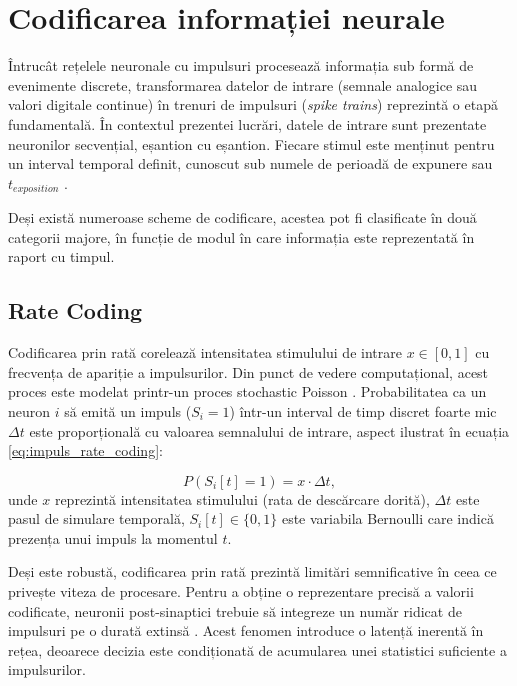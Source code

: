 \section{Codificarea informației neurale}
\label{sc:codificare}

Întrucât rețelele neuronale cu impulsuri procesează informația sub formă de evenimente discrete, transformarea datelor de intrare (semnale analogice sau valori digitale continue) în trenuri de impulsuri (\textit{spike trains}) reprezintă o etapă fundamentală. În contextul prezentei lucrări, datele de intrare sunt prezentate neuronilor secvențial, eșantion cu eșantion. Fiecare stimul este menținut pentru un interval temporal definit, cunoscut sub numele de perioadă de expunere sau $t_{exposition}$ \cite{falez2019}. 

Deși există numeroase scheme de codificare, acestea pot fi clasificate în două categorii majore, în funcție de modul în care informația este reprezentată în raport cu timpul.

\subsection*{Rate Coding}
Codificarea prin rată corelează intensitatea stimulului de intrare $x \in [0, 1]$ cu frecvența de apariție a impulsurilor. Din punct de vedere computațional, acest proces este modelat printr-un proces stochastic Poisson \cite{gerstner2002spiking}. Probabilitatea ca un neuron $i$ să emită un impuls ($S_i = 1$) într-un interval de timp discret foarte mic $\Delta t$ este proporțională cu valoarea semnalului de intrare, aspect ilustrat în ecuația \eqref{eq:impuls_rate_coding}:

\begin{equation}
\label{eq:impuls_rate_coding}
P(S_i[t] = 1) = x \cdot \Delta t,
\end{equation}
unde $x$ reprezintă intensitatea stimulului (rata de descărcare dorită), $\Delta t$ este pasul de simulare temporală, $S_i[t] \in \{0, 1\}$ este variabila Bernoulli care indică prezența unui impuls la momentul $t$.

Deși este robustă, codificarea prin rată prezintă limitări semnificative în ceea ce privește viteza de procesare. Pentru a obține o reprezentare precisă a valorii codificate, neuronii post-sinaptici trebuie să integreze un număr ridicat de impulsuri pe o durată extinsă \cite{guo2021}. Acest fenomen introduce o latență inerentă în rețea, deoarece decizia este condiționată de acumularea unei statistici suficiente a impulsurilor.

